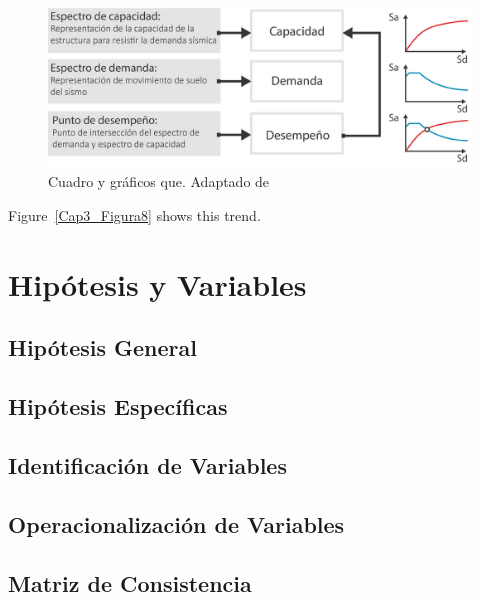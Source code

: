 \documentclass[doc, 12pt, a4paper, draftall]{apa7} %
\begin{document}
\begin{figure}[!ht]
	\centering
  \includegraphics[scale=0.36]{E_IMAGENES/3_Capitulo3/Cap3_Imagen70.png}
	\caption{\centering\footnotesize Cuadro y gráficos que. Adaptado de \cite{deWaal2009}}
	\label{Cap3_Figura2}
\end{figure}

Figure~\ref{Cap3_Figura8} shows this trend. \lipsum[16]

\section{Hipótesis y Variables}

\subsection{Hipótesis General}

\subsection{Hipótesis Específicas}

\subsection{Identificación de Variables}

\subsection{Operacionalización de Variables}

\subsection{Matriz de Consistencia}

\lipsum[17]

\lipsum[18]
\end{document}
